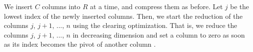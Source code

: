 \documentclass[11pt]{article}
\begin{document}
We insert $C$ columns into $R$ at a time, and compress them as before.  Let $j$ be the lowest index 
of the newly inserted columns.  Then, we start the reduction of the columns $j$, $j + 1$, ..., $n$ 
using the clearing optimization.  That is, we reduce the columns $j$, $j + 1$, ..., $n$ in 
decreasing dimension and set a column to zero as soon as its index becomes the pivot of another 
column \cite{chen-11}.





\end{document}
